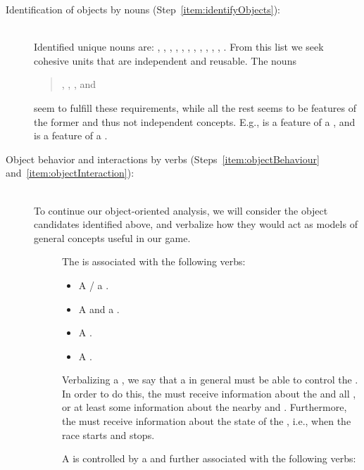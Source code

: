 \documentclass[fsharpNotes.tex]{subfiles}
\begin{document}
\begin{description}
\item[Identification of objects by nouns (Step~\ref{item:identifyObjects}):]~\\
  Identified unique nouns are: , , , , , , , , , , , . From this list we seek cohesive units that are independent and reusable. The nouns
  \begin{quote}
    , , , and 
  \end{quote}
  seem to fulfill these requirements, while all the rest seems to be features of the former and thus not independent concepts. E.g.,  is a feature of a , and  is a feature of a .
\item[Object behavior and interactions by verbs (Steps~\ref{item:objectBehaviour}  and~\ref{item:objectInteraction}):]~\\
  To continue our object-oriented analysis, we will consider the object candidates identified above, and verbalize how they would act as models of general concepts useful in our game.
\begin{description}
\item[] The  is associated with the following verbs:
  \begin{itemize}
  \item A  / a . 
  \item A   and  a .
  \item A   . 
  \item A  . 
  \end{itemize}
  Verbalizing a , we say that a  in general must be able to control the . In order to do this, the  must receive information about the  and all , or at least some information about the nearby  and . Furthermore, the  must receive information about the state of the , i.e., when the race starts and stops.
\item[] A  is controlled by a  and further associated with the following verbs:

\end{description}
\end{description}
\end{document}
